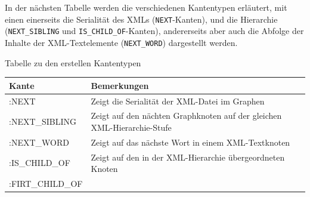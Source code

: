 \documentclass[ngerman,]{scrreprt}
\begin{document}
In der nächsten Tabelle werden die verschiedenen Kantentypen erläutert, mit einen einerseits die Serialität des XMLs (\texttt{NEXT}-Kanten), und die Hierarchie (\texttt{NEXT\_SIBLING} und \texttt{IS\_CHILD\_OF}-Kanten), andererseits aber auch die Abfolge der Inhalte der XML-Textelemente (\texttt{NEXT\_WORD}) dargestellt werden.

Tabelle zu den erstellen Kantentypen

\begin{longtable}[]{@{}ll@{}}
\toprule
\begin{minipage}[b]{0.22\columnwidth}\raggedright\strut
Kante\strut
\end{minipage} & \begin{minipage}[b]{0.72\columnwidth}\raggedright\strut
Bemerkungen\strut
\end{minipage}\tabularnewline
\midrule
\endhead
\begin{minipage}[t]{0.22\columnwidth}\raggedright\strut
:NEXT\strut
\end{minipage} & \begin{minipage}[t]{0.72\columnwidth}\raggedright\strut
Zeigt die Serialität der XML-Datei im Graphen\strut
\end{minipage}\tabularnewline
\begin{minipage}[t]{0.22\columnwidth}\raggedright\strut
:NEXT\_SIBLING\strut
\end{minipage} & \begin{minipage}[t]{0.72\columnwidth}\raggedright\strut
Zeigt auf den nächten Graphknoten auf der gleichen XML-Hierarchie-Stufe\strut
\end{minipage}\tabularnewline
\begin{minipage}[t]{0.22\columnwidth}\raggedright\strut
:NEXT\_WORD\strut
\end{minipage} & \begin{minipage}[t]{0.72\columnwidth}\raggedright\strut
Zeigt auf das nächste Wort in einem XML-Textknoten\strut
\end{minipage}\tabularnewline
\begin{minipage}[t]{0.22\columnwidth}\raggedright\strut
:IS\_CHILD\_OF\strut
\end{minipage} & \begin{minipage}[t]{0.72\columnwidth}\raggedright\strut
Zeigt auf den in der XML-Hierarchie übergeordneten Knoten\strut
\end{minipage}\tabularnewline
\begin{minipage}[t]{0.22\columnwidth}\raggedright\strut
:FIRT\_CHILD\_OF\strut

\end{minipage}
\end{longtable}
\end{document}
